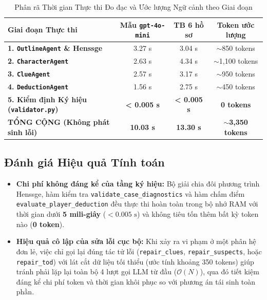 \begin{table}[H]
\centering
\caption{Phân rã Thời gian Thực thi Đo đạc và Ước lượng Ngữ cảnh theo Giai đoạn}
\label{tab:pipeline_breakdown}
{\small
\setlength{\tabcolsep}{5pt}
\begin{tabularx}{\textwidth}{X c c c}
\toprule
\textbf{Giai đoạn Thực thi} & \textbf{Mẫu \texttt{gpt-4o-mini}} & \textbf{TB 6 hồ sơ} & \textbf{Token ước lượng} \\
\midrule
\textbf{1. \texttt{OutlineAgent} \& Henssge} & 3.27 s & 3.04 s & $\sim$850 tokens \\
\textbf{2. \texttt{CharacterAgent}}          & 2.63 s & 4.34 s & $\sim$1,100 tokens \\
\textbf{3. \texttt{ClueAgent}}               & 2.57 s & 3.17 s & $\sim$950 tokens \\
\textbf{4. \texttt{DeductionAgent}}          & 1.56 s & 2.75 s & $\sim$450 tokens \\
\textbf{5. Kiểm định Ký hiệu (\texttt{validator.py})} & \textbf{< 0.005 s} & \textbf{< 0.005 s} & \textbf{0 tokens} \\
\midrule
\textbf{TỔNG CỘNG (Không phát sinh lỗi)} & \textbf{10.03 s} & \textbf{13.30 s} & \textbf{$\sim$3,350 tokens} \\
\bottomrule
\end{tabularx}
}
\end{table}

\subsection{Đánh giá Hiệu quả Tính toán}
\begin{itemize}[leftmargin=1.5cm]
    \item \textbf{Chi phí không đáng kể của tầng ký hiệu:} Bộ giải chia đôi phương trình Henssge, hàm kiểm tra \texttt{validate\_case\_diagnostics} và hàm chấm điểm \texttt{evaluate\_player\_deduction} đều thực thi hoàn toàn trong bộ nhớ RAM với thời gian dưới \textbf{5 mili-giây} ($< 0.005\text{ s}$) và không tiêu tốn thêm bất kỳ token nào (\textbf{0 token}).
    \item \textbf{Hiệu quả cô lập của sửa lỗi cục bộ:} Khi xảy ra vi phạm ở một phân hệ đơn lẻ, việc chỉ gọi lại đúng tác tử lỗi (\texttt{repair\_clues}, \texttt{repair\_suspects}, hoặc \texttt{repair\_tod}) với lát cắt dữ liệu tối thiểu (ước tính khoảng 350 tokens) giúp tránh phải lặp lại toàn bộ 4 lượt gọi LLM từ đầu ($\mathcal{O}(N)$), qua đó tiết kiệm đáng kể chi phí token và thời gian khôi phục so với phương án tái sinh toàn phần.
\end{itemize}
